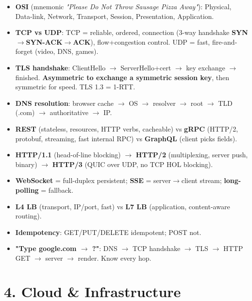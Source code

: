 \documentclass[11pt]{article}
\providecommand{\tightlist}{\setlength{\itemsep}{1pt}\setlength{\parskip}{0pt}}
\begin{document}
\begin{itemize}
\tightlist
\item
  \textbf{OSI} (mnemonic \emph{"Please Do Not Throw Sausage Pizza Away"}): Physical, Data-link, Network, Transport, Session, Presentation, Application.
\item
  \textbf{TCP vs UDP}: TCP = reliable, ordered, connection (3-way handshake \textbf{SYN\(\rightarrow\)SYN-ACK\(\rightarrow\)ACK}), flow+congestion control. UDP = fast, fire-and-forget (video, DNS, games).
\item
  \textbf{TLS handshake}: ClientHello \(\rightarrow\) ServerHello+cert \(\rightarrow\) key exchange \(\rightarrow\) finished. \textbf{Asymmetric to exchange a symmetric session key}, then symmetric for speed. TLS 1.3 = 1-RTT.
\item
  \textbf{DNS resolution}: browser cache \(\rightarrow\) OS \(\rightarrow\) resolver \(\rightarrow\) root \(\rightarrow\) TLD (.com) \(\rightarrow\) authoritative \(\rightarrow\) IP.
\item
  \textbf{REST} (stateless, resources, HTTP verbs, cacheable) vs \textbf{gRPC} (HTTP/2, protobuf, streaming, fast internal RPC) vs \textbf{GraphQL} (client picks fields).
\item
  \textbf{HTTP/1.1} (head-of-line blocking) \(\rightarrow\) \textbf{HTTP/2} (multiplexing, server push, binary) \(\rightarrow\) \textbf{HTTP/3} (QUIC over UDP, no TCP HOL blocking).
\item
  \textbf{WebSocket} = full-duplex persistent; \textbf{SSE} = server\(\rightarrow\)client stream; \textbf{long-polling} = fallback.
\item
  \textbf{L4 LB} (transport, IP/port, fast) vs \textbf{L7 LB} (application, content-aware routing).
\item
  \textbf{Idempotency}: GET/PUT/DELETE idempotent; POST not.
\item
  \textbf{"Type google.com \(\rightarrow\) ?"}: DNS \(\rightarrow\) TCP handshake \(\rightarrow\) TLS \(\rightarrow\) HTTP GET \(\rightarrow\) server \(\rightarrow\) render. Know every hop.
\end{itemize}

\section{4. Cloud \& Infrastructure}\label{4-cloud--infrastructure}
\end{document}

